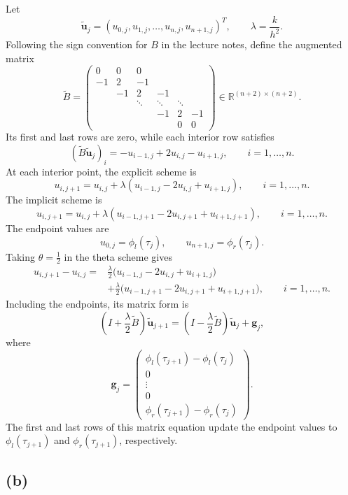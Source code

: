 \documentclass{article}
\begin{document}
Let
\[
\widetilde{\mathbf u}_j
=(u_{0,j},u_{1,j},\ldots,u_{n,j},u_{n+1,j})^T,
\qquad \lambda=\frac{k}{h^2}.
\]
Following the sign convention for \(B\) in the lecture notes, define
the augmented matrix
\[
\widetilde B=
\begin{pmatrix}
0&0&0&&&\\
-1&2&-1&&&\\
&-1&2&-1&&\\
&&\ddots&\ddots&\ddots&\\
&&&-1&2&-1\\
&&&&0&0
\end{pmatrix}
\in\mathbb R^{(n+2)\times(n+2)}.
\]
Its first and last rows are zero, while each interior row satisfies
\[
(\widetilde B\widetilde{\mathbf u}_j)_i
=-u_{i-1,j}+2u_{i,j}-u_{i+1,j},
\qquad i=1,\ldots,n.
\]
At each interior point, the explicit scheme is
\[
u_{i,j+1}
=u_{i,j}
+\lambda(u_{i-1,j}-2u_{i,j}+u_{i+1,j}),
\qquad i=1,\ldots,n.
\]
The implicit scheme is
\[
u_{i,j+1}
=u_{i,j}
+\lambda(u_{i-1,j+1}-2u_{i,j+1}+u_{i+1,j+1}),
\qquad i=1,\ldots,n.
\]
The endpoint values are
\[
u_{0,j}=\phi_l(\tau_j),\qquad
u_{n+1,j}=\phi_r(\tau_j).
\]
Taking \(\theta=\frac12\) in the theta scheme gives
\[
\begin{aligned}
u_{i,j+1}-u_{i,j}
={}&\frac{\lambda}{2}
 \bigl(u_{i-1,j}-2u_{i,j}+u_{i+1,j}\bigr)\\
&+\frac{\lambda}{2}
 \bigl(u_{i-1,j+1}-2u_{i,j+1}+u_{i+1,j+1}\bigr),
\qquad i=1,\ldots,n.
\end{aligned}
\]
Including the endpoints, its matrix form is
\[
\boxed{
\left(I+\frac{\lambda}{2}\widetilde B\right)
\widetilde{\mathbf u}_{j+1}
=
\left(I-\frac{\lambda}{2}\widetilde B\right)
\widetilde{\mathbf u}_{j}
+\mathbf g_j,
}
\]
where
\[
\mathbf g_j=
\begin{pmatrix}
\phi_l(\tau_{j+1})-\phi_l(\tau_j)\\
0\\
\vdots\\
0\\
\phi_r(\tau_{j+1})-\phi_r(\tau_j)
\end{pmatrix}.
\]
The first and last rows of this matrix equation update the endpoint
values to \(\phi_l(\tau_{j+1})\) and \(\phi_r(\tau_{j+1})\), respectively.

\subsection*{(b)}
\end{document}

